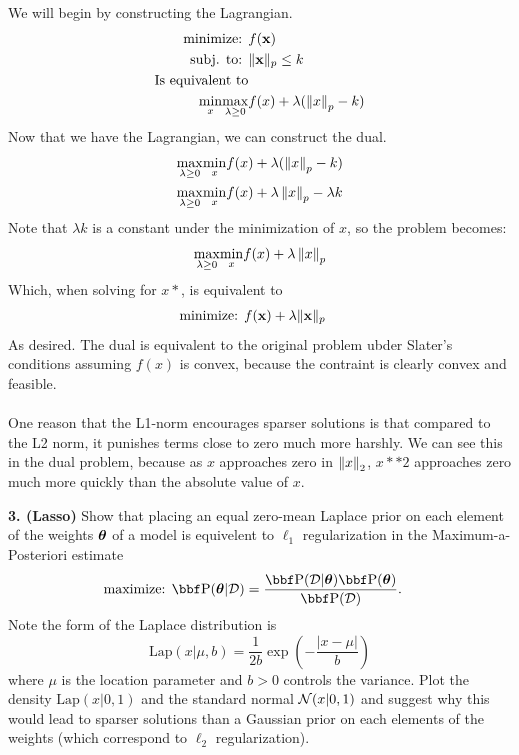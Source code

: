 \documentclass[12pt,letterpaper,fleqn]{hmcpset}
\begin{document}
We will begin by constructing the Lagrangian.
\begin{align*}
     \text{minimize: } & f({\bf x}) \\
     \text{subj. to: } & \|{\bf x}\|_p \leq k \\
     \text{Is equivalent to}\\    
     \underset{x}{\min}\underset{\lambda \geq 0}{\max} & f(x) + \lambda(\left\lVert x\right\rVert_p - k) \\
\end{align*}
Now that we have the Lagrangian, we can construct the dual. 
\begin{align*}
    \underset{\lambda \geq 0}{\max} \underset{x}{\min}& f(x) + \lambda(\left\lVert x\right\rVert_p - k) \\
    \underset{\lambda \geq 0}{\max} \underset{x}{\min}& f(x) + \lambda \left\lVert x\right\rVert_p - \lambda k \\
\end{align*}
Note that $\lambda k$ is a constant under the minimization of $x$, so the problem becomes:
    $$\underset{\lambda \geq 0}{\max}  \underset{x}{\min} f(x) + \lambda \left\lVert x\right\rVert_p$$
Which, when solving for $x*$, is equivalent to 
\begin{align*}
    \text{minimize: } & f({\bf x}) + \lambda\|{\bf x}\|_p
\end{align*}
As desired. The dual is equivalent to the original problem ubder Slater's conditions assuming $f(x)$ is convex, because the contraint is clearly convex and feasible. \\\\

One reason that the L1-norm encourages sparser solutions is that compared to the L2 norm, it punishes terms close to zero much more harshly. We can see this in the dual problem, because as $x$ approaches zero in $\left\lVert x\right\rVert_2$, $x**2$ approaches zero much more quickly than the absolute value of $x$.


\textbf{3. (Lasso)} Show that placing an equal zero-mean Laplace prior on each element of the weights $\hbox{\boldmath$\theta$}$
of a model is equivelent to $\ell_1$ regularization in the Maximum-a-Posteriori estimate
\begin{align*}
    \text{maximize: } & \PP(\thetab | \Dc) = \frac{\PP(\Dc | \thetab)\PP(\thetab)}{\PP(\Dc)}.
\end{align*}
Note the form of the Laplace distribution is
\[
    \mathrm{Lap}(x|\mu,b) = \frac{1}{2b}\exp\left(-\frac{|x-\mu|}{b}\right)
\]
where $\mu$ is the location parameter and $b>0$ controls the variance. Plot the density
$\mathrm{Lap}(x|0,1)$ and the standard normal ${\cal N}(x|0,1)$ and suggest why this would
lead to sparser solutions than a Gaussian prior on each elements of the weights
(which correspond to $\ell_2$ regularization).\\[1em]
\end{document}
